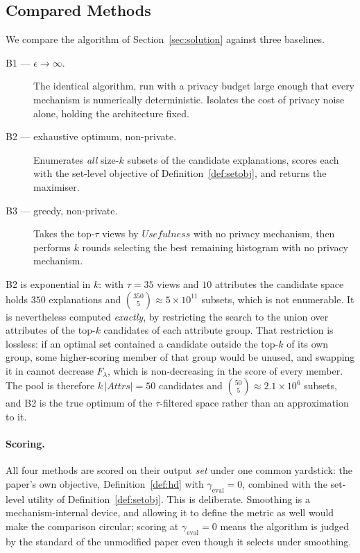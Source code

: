 \subsection{Compared Methods}
\label{subsec:compared-methods}

We compare the algorithm of Section~\ref{sec:solution} against three baselines.

\begin{description}
  \item[B1 --- $\epsilon\rightarrow\infty$.] The identical algorithm, run with a privacy budget large enough that every mechanism is numerically deterministic. Isolates the cost of privacy noise alone, holding the architecture fixed.
  \item[B2 --- exhaustive optimum, non-private.] Enumerates \emph{all} size-$k$ subsets of the candidate explanations, scores each with the set-level objective of Definition~\ref{def:setobj}, and returns the maximiser.
  \item[B3 --- greedy, non-private.] Takes the top-$\tau$ views by $Usefulness$ with no privacy mechanism, then performs $k$ rounds selecting the best remaining histogram with no privacy mechanism.
\end{description}

B2 is exponential in $k$: with $\tau=35$ views and $10$ attributes the candidate space holds $350$ explanations and $\binom{350}{5}\approx5\times10^{11}$ subsets, which is not enumerable.
It is nevertheless computed \emph{exactly}, by restricting the search to the union over attributes of the top-$k$ candidates of each attribute group.
That restriction is lossless: if an optimal set contained a candidate outside the top-$k$ of its own group, some higher-scoring member of that group would be unused, and swapping it in cannot decrease $F_\lambda$, which is non-decreasing in the score of every member.
The pool is therefore $k\,|Attrs|=50$ candidates and $\binom{50}{5}\approx2.1\times10^{6}$ subsets, and B2 is the true optimum of the $\tau$-filtered space rather than an approximation to it.

\paragraph{Scoring.}
All four methods are scored on their output \emph{set} under one common yardstick: the paper's own objective, Definition~\ref{def:hd} with $\gamma_{\text{eval}}=0$, combined with the set-level utility of Definition~\ref{def:setobj}.
This is deliberate. Smoothing is a mechanism-internal device, and allowing it to define the metric as well would make the comparison circular; scoring at $\gamma_{\text{eval}}=0$ means the algorithm is judged by the standard of the unmodified paper even though it selects under smoothing.

